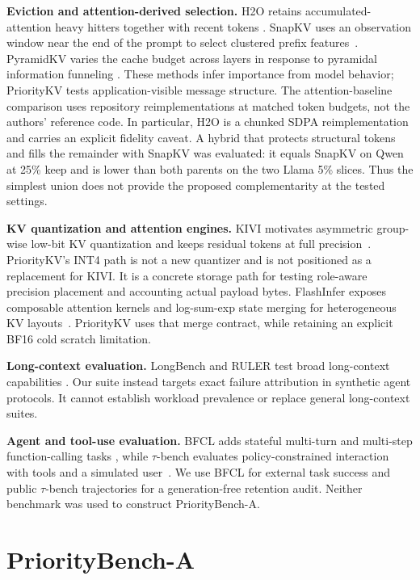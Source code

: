 \textbf{Eviction and attention-derived selection.}
H2O retains accumulated-attention heavy hitters together with recent tokens
\cite{zhang2023h2o}.  SnapKV uses an observation window near the end of the
prompt to select clustered prefix features~\cite{li2024snapkv}.  PyramidKV varies
the cache budget across layers in response to pyramidal information funneling
\cite{cai2024pyramidkv}.  These methods infer importance from model behavior;
PriorityKV tests application-visible message structure.  The attention-baseline
comparison uses repository reimplementations at matched token budgets, not the
authors' reference code.  In particular, H2O is a chunked SDPA
reimplementation and carries an explicit fidelity caveat.  A hybrid that
protects structural tokens and fills the remainder with SnapKV was evaluated:
it equals SnapKV on Qwen at 25\% keep and is lower than both parents on the two
Llama 5\% slices.  Thus the simplest union does not provide the proposed
complementarity at the tested settings.

\textbf{KV quantization and attention engines.}
KIVI motivates asymmetric group-wise low-bit KV quantization and keeps residual
tokens at full precision~\cite{liu2024kivi}.  PriorityKV's INT4 path is not a new
quantizer and is not positioned as a replacement for KIVI.  It is a concrete
storage path for testing role-aware precision placement and accounting actual
payload bytes.  FlashInfer exposes composable attention kernels and
log-sum-exp state merging for heterogeneous KV layouts~\cite{ye2025flashinfer}.
PriorityKV uses that merge contract, while retaining an explicit BF16 cold
scratch limitation.

\textbf{Long-context evaluation.}
LongBench and RULER test broad long-context capabilities
\cite{bai2024longbench,hsieh2024ruler}.  Our suite instead targets exact failure
attribution in synthetic agent protocols.  It cannot establish workload
prevalence or replace general long-context suites.

\textbf{Agent and tool-use evaluation.}
BFCL adds stateful multi-turn and multi-step function-calling tasks
\cite{patil2025bfcl}, while $\tau$-bench evaluates policy-constrained interaction
with tools and a simulated user~\cite{yao2024taubench}.  We use BFCL for external
task success and public $\tau$-bench trajectories for a generation-free
retention audit.  Neither benchmark was used to construct PriorityBench-A.

\section{PriorityBench-A}
\label{sec:benchmark}

